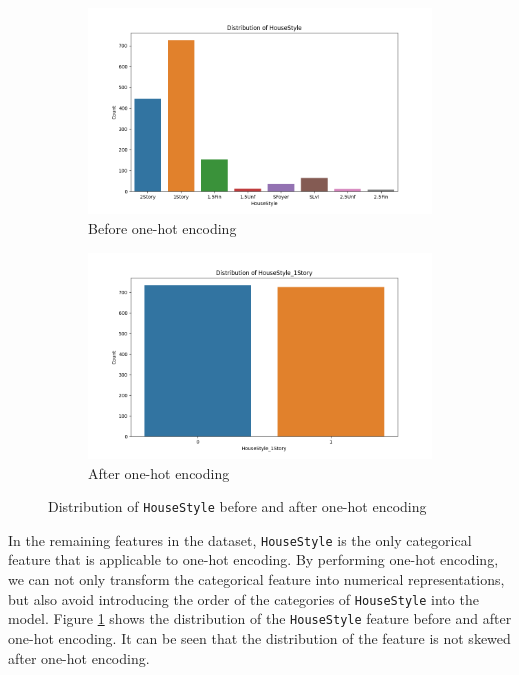 \documentclass[10pt]{article}
\begin{document}
\begin{figure}[!htbp]
    \centering
    \begin{subfigure}[b]{0.49\textwidth}
        \centering
        \includegraphics[width=\textwidth]{../hw1/img/Part_I/HouseStyle_before.png}
        \caption{Before one-hot encoding}
    \end{subfigure}
    \hfill
    \begin{subfigure}[b]{0.49\textwidth}
        \centering
        \includegraphics[width=\textwidth]{../hw1/img/Part_I/HouseStyle_after.png}
        \caption{After one-hot encoding}
    \end{subfigure}
    \caption{Distribution of \texttt{HouseStyle} before and after one-hot encoding}
    \label{fig:housestyle_before_after}
\end{figure}

In the remaining features in the dataset, \texttt{HouseStyle} is the only categorical feature that is applicable to one-hot encoding. By performing one-hot encoding, we can not only transform the categorical feature into numerical representations, but also avoid introducing the order of the categories of \texttt{HouseStyle} into the model. Figure \ref{fig:housestyle_before_after} shows the distribution of the \texttt{HouseStyle} feature before and after one-hot encoding. It can be seen that the distribution of the feature is not skewed after one-hot encoding.
\end{document}
